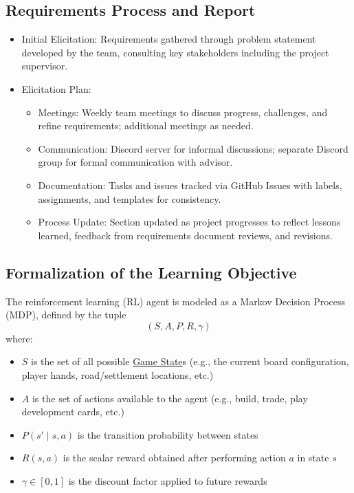 \documentclass{article}
\newcommand{\GameState}{\href{https://milvus.io/ai-quick-reference/what-is-a-state-in-rl}{Game State}}
\begin{document}
\subsection{Requirements Process and Report}\label{subsec:reqprocess}
\begin{itemize}
    \item {Initial Elicitation}: Requirements gathered through problem statement developed by the team, consulting key stakeholders including the project supervisor.
    \item {Elicitation Plan}:
    \begin{itemize}
        \item Meetings: Weekly team meetings to discuss progress, challenges, and refine requirements; additional meetings as needed.
        \item Communication: Discord server for informal discussions; separate Discord group for formal communication with advisor.
        \item Documentation: Tasks and issues tracked via GitHub Issues with labels, assignments, and templates for consistency.
        \item Process Update: Section updated as project progresses to reflect lessons learned, feedback from requirements document reviews, and revisions.
    \end{itemize}
\end{itemize}

\newpage{}

\subsection{Formalization of the Learning Objective}
\label{sec:formalization}

The reinforcement learning (RL) agent is modeled as a Markov Decision Process (MDP), defined by the tuple
\[
(S, A, P, R, \gamma)
\]
where:
\begin{itemize}
    \item $S$ is the set of all possible \GameState{}s (e.g., the current board configuration, player hands, road/settlement locations, etc.)
    \item $A$ is the set of actions available to the agent (e.g., build, trade, play development cards, etc.)
    \item $P(s' \mid s, a)$ is the transition probability between states
    \item $R(s, a)$ is the scalar reward obtained after performing action $a$ in state $s$
    \item $\gamma \in [0, 1]$ is the discount factor applied to future rewards
\end{itemize}
\end{document}
